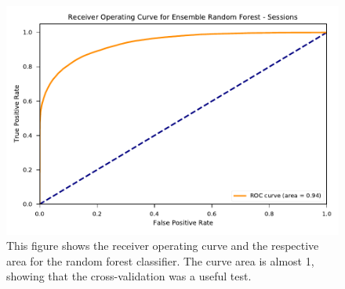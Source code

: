 \documentclass{l4proj}
\begin{document}
\begin{appendices}
\begin{figure}[htb]
    \centering
    \includegraphics[width=0.80\linewidth]{images/sessions/roc_EnsembleRandomForestSessions.pdf}
    \caption{This figure shows the receiver operating curve and the respective area for the random forest classifier. The curve area is almost 1, showing that the cross-validation was a useful test.}
    \label{fig:session_random_forest_roc} 
\end{figure}


\end{appendices}
\end{document}
